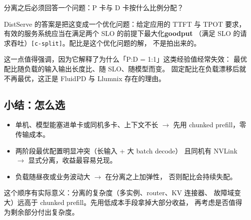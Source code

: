 分离之后必须回答一个问题：P 卡与 D 卡按什么比例分配？

DistServe 的答案是把这变成一个优化问题：给定应用的 TTFT 与 TPOT 要求，
有效的服务系统应当在满足两个 SLO 的前提下最大化\textbf{goodput}
（满足 SLO 的请求吞吐）\texttt{[c-split]}。配比是这个优化问题的解，
不是拍出来的。

这一点值得强调，因为它解释了为什么「P:D = 1:1」这类经验值经常失效：
最优配比随负载的输入输出长度比、随 SLO、随模型而变。
固定配比在负载漂移后就不再最优，这正是 FluidPD 与 Llumnix 存在的理由。

\subsection{小结：怎么选}

\begin{itemize}[leftmargin=1.3em,itemsep=1.5pt,topsep=2pt]
  \item 单机、模型能塞进单卡或同机多卡、上下文不长
        $\rightarrow$ 先用 chunked prefill，零传输成本。
  \item 两阶段最优配置明显冲突（长输入 + 大 batch decode）
        且同机有 NVLink $\rightarrow$ 显式分离，收益最容易兑现。
  \item 负载随昼夜或业务波动大 $\rightarrow$ 在分离之上加弹性，
        否则配比会持续失配。
\end{itemize}

这个顺序有实际意义：分离的复杂度（多实例、router、KV 连接器、
故障域变大）远高于 chunked prefill。先用低成本手段拿掉大部分收益，
再考虑是否值得为剩余部分付出复杂度。
